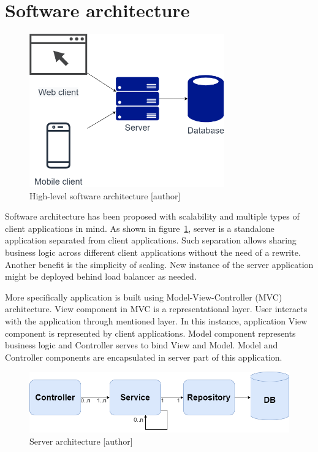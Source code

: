 
\section{Software architecture}\label{sec:software-architecture}

\begin{figure}[h!]
    \includegraphics[width=0.75\textwidth]{images/high-level-architecture}
    \caption{High-level software architecture [author]}
    \label{fig:high-level-architecture}
\end{figure}

Software architecture has been proposed with scalability and multiple types of client applications in mind.
As shown in figure~\ref{fig:high-level-architecture}, server is a standalone application separated from client applications.
Such separation allows sharing business logic across different client applications without the need of a rewrite.
Another benefit is the simplicity of scaling.
New instance of the server application might be deployed behind load balancer as needed.

More specifically application is built using Model-View-Controller (MVC) architecture.\cite{wiki-mvc}
View component in MVC is a representational layer.
User interacts with the application through mentioned layer.
In this instance, application View component is represented by client applications.
Model component represents business logic and Controller serves to bind View and Model.
Model and Controller components are encapsulated in server part of this application.

\begin{figure}[h!]
    \includegraphics[width=1\textwidth]{images/server-mvc-spring}
    \caption{Server architecture [author]}
    \label{fig:server-mvc-spring}
\end{figure}


